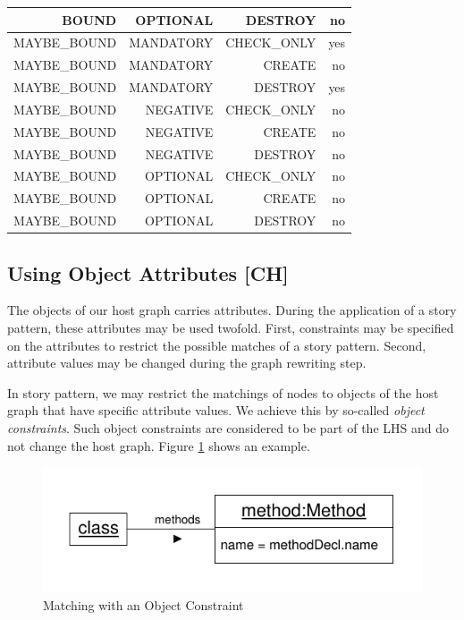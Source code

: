 \begin{table}[htbp]
\begin{tabular}{|r|r|r|r|}
    BOUND & OPTIONAL & DESTROY & no \\
    \hline
    MAYBE\_BOUND & MANDATORY & CHECK\_ONLY & yes \\
    MAYBE\_BOUND & MANDATORY & CREATE & no \\
    MAYBE\_BOUND & MANDATORY & DESTROY & yes \\
    MAYBE\_BOUND & NEGATIVE & CHECK\_ONLY & no \\
    MAYBE\_BOUND & NEGATIVE & CREATE & no \\
    MAYBE\_BOUND & NEGATIVE & DESTROY & no \\
    MAYBE\_BOUND & OPTIONAL & CHECK\_ONLY & no \\
    MAYBE\_BOUND & OPTIONAL & CREATE & no \\
    MAYBE\_BOUND & OPTIONAL & DESTROY & no \\
    \hline
    \end{tabular}%
  \label{tab:bindingCombinations}%
\end{table}%


\subsection{Using Object Attributes [CH]}
\label{sec:StoryPatterns:attributes}

The objects of our host graph carries attributes. During the application of a story pattern, these attributes may be used twofold. First, constraints may be specified on the attributes to restrict the possible matches of a story pattern. Second, attribute values may be changed during the graph rewriting step.

In story pattern, we may restrict the matchings of nodes to objects of the host graph that have specific attribute values. We achieve this by so-called \emph{object constraints}. Such object constraints are considered to be part of the LHS and do not change the host graph. Figure \ref{fig:objectConstraint} shows an example.

\begin{figure}[htbp]
  \centering
  \includegraphics[scale=1]{figures/ObjectConstraint}
  \caption{Matching with an Object Constraint}
  \label{fig:objectConstraint}
\end{figure}

